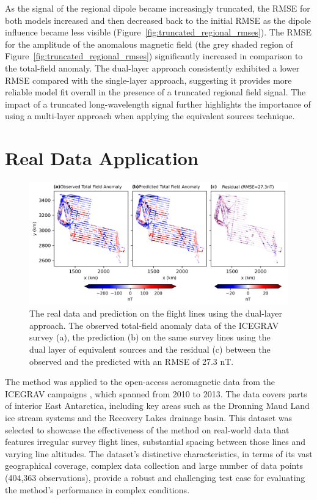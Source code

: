 As the signal of the regional dipole became increasingly truncated, the RMSE for both models increased and then decreased back to the initial RMSE as the dipole influence became less visible (Figure~\ref{fig:truncated_regional_rmses}). The RMSE for the amplitude of the anomalous magnetic field (the grey shaded region of Figure~\ref{fig:truncated_regional_rmses}) significantly increased in comparison to the total-field anomaly. The dual-layer approach consistently exhibited a lower RMSE compared with the single-layer approach, suggesting it provides more reliable model fit overall in the presence of a truncated regional field signal. The impact of a truncated long-wavelength signal further highlights the importance of using a multi-layer approach when applying the equivalent sources technique.


\section{Real Data Application}
\label{sec:real_application}

\begin{figure}[tb!]
\centering
\includegraphics[width=1\linewidth]{figures/real_line_pred.png}
\caption{
    The real data and prediction on the flight lines using the dual-layer approach. The observed total-field anomaly data of the ICEGRAV survey \citep{ICEGRAV_data} (a), the prediction (b) on the same survey lines using the dual layer of equivalent sources and the residual (c) between the observed and the predicted with an RMSE of 27.3 nT.
}
\label{fig:real_line_pred}
\end{figure}

The method was applied to the open-access aeromagnetic data from the ICEGRAV campaigns \citep{ICEGRAV_data}, which spanned from 2010 to 2013. The data covers parts of interior East Antarctica, including key areas such as the Dronning Maud Land ice stream systems and the Recovery Lakes drainage basin. This dataset was selected to showcase the effectiveness of the method on real-world data that features irregular survey flight lines, substantial spacing between those lines and varying line altitudes. The dataset’s distinctive characteristics, in terms of its vast geographical coverage, complex data collection and large number of data points (404,363 observations), provide a robust and challenging test case for evaluating the method's performance in complex conditions.

